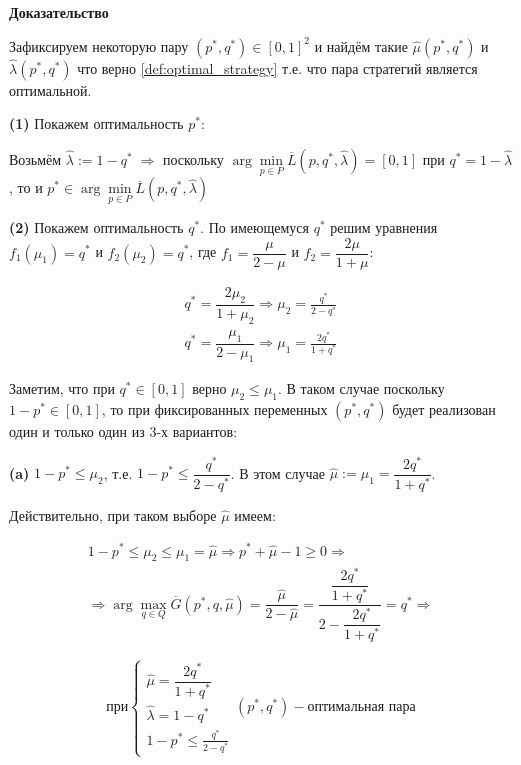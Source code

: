 \begin{flushleft}
	\textbf{Доказательство}

Зафиксируем некоторую пару  $(p^{*}, q^{*}) \in [0, 1]^{2}$ и найдём такие 
$\hat{\mu}(p^{*}, q^{*})$ и $\hat{\lambda}(p^{*}, q^{*})$ 
что верно \eqref{def:optimal_strategy} т.е. что пара стратегий является оптимальной.

\textbf{(1)} Покажем оптимальность $p^{*}$:

Возьмём $\hat \lambda := 1 - q^* \; \Rightarrow$  поскольку 
$\arg \min\limits_{p \in P} \overline L(p, q^*, \hat \lambda) = [0,1]$ 
при $ q^* = 1 - \hat \lambda$, 
то и $p^* \in \arg \min \limits_{p \in P} \overline L(p, q^*, \hat \lambda)$


\textbf{(2)} Покажем оптимальность $q^{*}$. По имеющемуся $q^*$ 
решим уравнения $f_1(\mu_1)=q^*$ и $f_2(\mu_2)=q^*$, где
$f_1=\dfrac{\mu}{2 - \mu}$ и $f_2=\dfrac{2 \mu}{1 + \mu}$:

\begin{gather*}
	q^*=\dfrac{2 \mu_2}{1 + \mu_2} \Rightarrow \mu_2 = \frac{q^*}{2 - q^*} \\
	q^*=\dfrac{\mu_1}{2 - \mu_1} \Rightarrow \mu_1 = \frac{2 q^*}{1 + q^*}
\end{gather*} 


Заметим, что при $q^* \in [0, 1]$ верно $\mu_2 \leqslant \mu_1$.
В таком случае поскольку $1 - p^* \in [0, 1]$, то при фиксированных переменных 
$(p^*, q^*)$ будет реализован один и только один из 3-х вариантов:

\textbf{(a)}
$1 - p^* \leqslant \mu_2$, т.е.  $1 - p^* \leqslant \dfrac{q^*}{2 - q^*}$.
В этом случае $\hat \mu := \mu_1 = \dfrac{2 q^*}{1 + q^*}$.

Действительно, при таком выборе $\hat{\mu}$ имеем: 

\begin{gather*}
	1 - p^* \leqslant \mu_2 \leqslant \mu_1 = \hat \mu \Rightarrow
	p^* + \hat \mu - 1 \geqslant 0 \Rightarrow 
	\\	
	\Rightarrow \arg \max \limits_{q \in Q} \overline G(p^*, q, \hat \mu) =
	\dfrac{\hat{\mu}}{2-\hat{\mu}} =
	\dfrac{\dfrac{2 q^*}{1 + q^*}}{2 - \dfrac{2 q^*}{1 + q^*}} =
	q^* \Rightarrow
\end{gather*} 

$$
	\textrm{при}
	\begin{cases}
		\hat \mu = \dfrac{2 q^*}{1 + q^*} \\
		\hat \lambda = 1 - q^* \\
		1 - p^* \leq \frac{q^*}{2 - q^*}
	\end{cases}
	(p^*, q^*) - \textrm{оптимальная пара}
$$


\end{flushleft}
